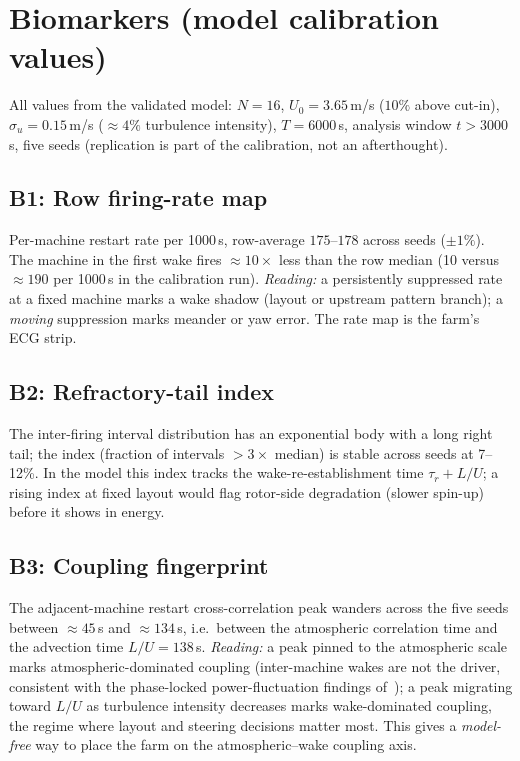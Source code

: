 \documentclass[11pt]{article}
\begin{document}
\section{Biomarkers (model calibration values)}

All values from the validated model: $N=16$, $U_0=3.65$\,m/s ($10\%$ above cut-in),
$\sigma_u=0.15$\,m/s ($\approx 4\%$ turbulence intensity), $T=6000$\,s, analysis window
$t>3000$\,s, five seeds (replication is part of the calibration, not an afterthought).

\subsection{B1: Row firing-rate map}
Per-machine restart rate per 1000\,s, row-average $175$--$178$ across seeds ($\pm 1\%$).
The machine in the first wake fires $\approx 10\times$ less than the row median
(10 versus $\approx 190$ per 1000\,s in the calibration run). \emph{Reading:} a persistently
suppressed rate at a fixed machine marks a wake shadow (layout or upstream pattern branch);
a \emph{moving} suppression marks meander or yaw error. The rate map is the farm's ECG
strip.

\subsection{B2: Refractory-tail index}
The inter-firing interval distribution has an exponential body with a long right tail; the
index (fraction of intervals $>3\times$ median) is stable across seeds at 7--12\%. In the
model this index tracks the wake-re-establishment time $\tau_r + L/U$; a rising index at
fixed layout would flag rotor-side degradation (slower spin-up) before it shows in energy.

\subsection{B3: Coupling fingerprint}
The adjacent-machine restart cross-correlation peak wanders across the five seeds between
$\approx 45$\,s and $\approx 134$\,s, i.e.\ between the atmospheric correlation time and
the advection time $L/U=138$\,s. \emph{Reading:} a peak pinned to the atmospheric scale
marks atmospheric-dominated coupling (inter-machine wakes are not the driver, consistent
with the phase-locked power-fluctuation findings of~\cite{Anvari2016}); a peak migrating
toward $L/U$ as turbulence intensity decreases marks wake-dominated coupling, the regime
where layout and steering decisions matter most. This gives a \emph{model-free}
way to place the farm on the atmospheric--wake coupling axis.
\end{document}
